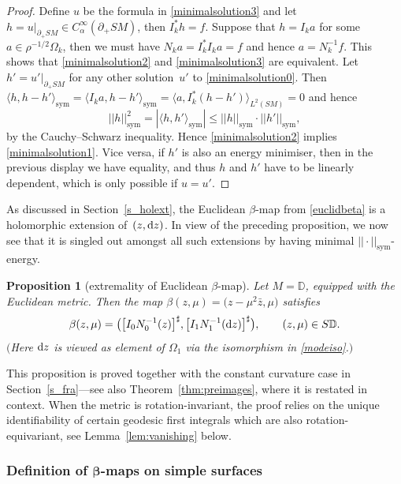 \documentclass[pdftex]{sigma}
\numberwithin{equation}{section}
\newtheorem{Proposition}[Theorem]{Proposition}
\theoremstyle{definition}
\newcommand{\DD}{\mathbb{D}} %
\newcommand{\1}{{\bf 1}}
\begin{document}
\begin{proof}
Define $u$ be the formula in \ref{minimalsolution3} and let $h=u|_{\partial_+SM}\in C^\infty_\alpha(\partial_+SM)$, then $I_k^* h = f$. Suppose that $h=I_k a$ for some $a\in \rho^{-1/2}\Omega_k$, then we must have $N_k a = I_k^*I_k a = f$ and hence $a=N_k^{-1} f$. This shows that \ref{minimalsolution2} and \ref{minimalsolution3} are equivalent. Let $h'=u'|_{\partial_+SM}$ for any other solution~$u'$ to \eqref{minimalsolution0}. Then
$
	\langle h, h-h'\rangle_{\mathrm{sym}}=\langle I_k a, h-h'\rangle_{\mathrm{sym}}= \langle a, I_k^*(h-h')\rangle_{L^2(SM)}=0
$ and hence
\[
|| h ||_\mathrm{sym}^2 =|\langle h, h'\rangle_\mathrm{sym}| \le || h ||_\mathrm{sym}\cdot || h' ||_\mathrm{sym},
\]
by the Cauchy--Schwarz inequality. Hence
 \ref{minimalsolution2} implies \ref{minimalsolution1}. Vice versa, if $h'$ is also an energy minimiser, then in the previous display we have equality, and thus $h$ and $h'$ have to be linearly dependent, which is only possible if $u=u'$.
\end{proof}

As discussed in Section~\ref{s_holext}, the Euclidean $\beta$-map from \eqref{euclidbeta} is a holomorphic extension of~$(z,{\rm d}z)$. In view of the preceding proposition, we now see that it is singled out amongst all such extensions by having minimal $||\cdot||_\mathrm{sym}$-energy.

\begin{Proposition}[extremality of Euclidean $\beta$-map] \label{extramlbeta} Let $M=\DD$, equipped with the Euclidean metric. Then the map $\beta(z,\mu)=\bigl(z-\mu^2\bar z,\mu\bigr)$ satisfies
\[\beta(z,\mu)=\bigl(\big[I_{0}N_{0}^{-1}(z)\big]^{\sharp}, \big[I_{1}N_{1}^{-1}({\rm d}z)\big]^{\sharp}\bigr),\qquad (z,\mu)\in S\DD.\]
$($Here ${\rm d}z$ is viewed as element of $\Omega_1$ via the isomorphism in \eqref{modeiso}.$)$
\end{Proposition}

This proposition is proved together with the constant curvature case in Section~\ref{s_fra}---see also Theorem~\ref{thm:preimages}, where it is restated in context. When the metric is rotation-invariant, the proof relies on the unique identifiability of certain geodesic first integrals which are also rotation-equivariant, see Lemma~\ref{lem:vanishing} below.

\subsubsection[Definition of beta-maps on simple surfaces]{Definition of $\boldsymbol{\beta}$-maps on simple surfaces}
\end{document}
